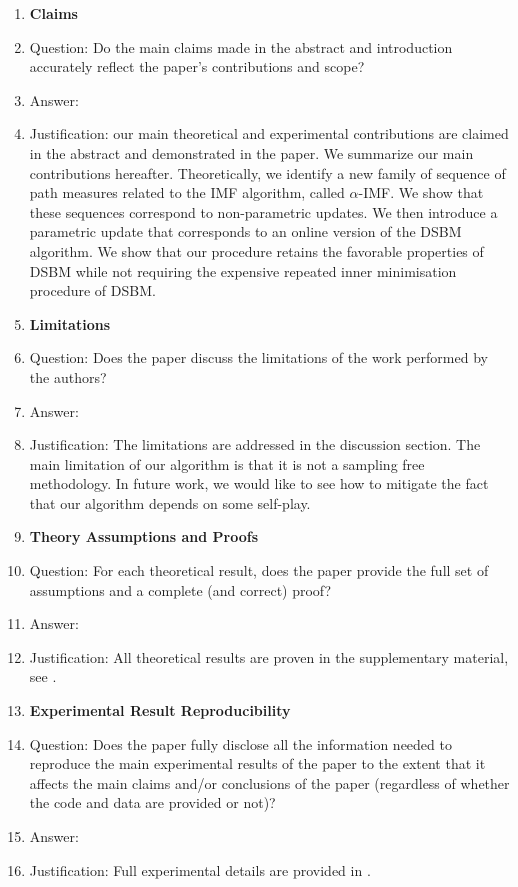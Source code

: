 \documentclass{article}
\begin{document}
\begin{enumerate}

\item {\bf Claims}
    \item[] Question: Do the main claims made in the abstract and introduction accurately reflect the paper's contributions and scope?
    \item[] Answer: \answerYes{}  %
    \item[] Justification: our main theoretical and experimental contributions are claimed in the abstract and demonstrated in the paper. We summarize our main contributions hereafter. Theoretically, we identify a new family of sequence of path measures related to the IMF algorithm, called $\alpha$-IMF. We show that these sequences correspond to non-parametric updates. We then introduce a parametric update that corresponds to an online version of the DSBM algorithm. We show that our procedure retains the favorable properties of DSBM while not requiring the expensive repeated inner minimisation procedure of DSBM.

\item {\bf Limitations}
    \item[] Question: Does the paper discuss the limitations of the work performed by the authors?
    \item[] Answer: \answerYes{} %
    \item[] Justification: The limitations are addressed in the discussion section. The main limitation of our algorithm is that it is not a sampling free methodology. In future work, we would like to see how to mitigate the fact that our algorithm depends on some self-play.

\item {\bf Theory Assumptions and Proofs}
    \item[] Question: For each theoretical result, does the paper provide the full set of assumptions and a complete (and correct) proof?
    \item[] Answer: \answerYes{} %
    \item[] Justification: All theoretical results are proven in the supplementary material, see .

    \item {\bf Experimental Result Reproducibility}
    \item[] Question: Does the paper fully disclose all the information needed to reproduce the main experimental results of the paper to the extent that it affects the main claims and/or conclusions of the paper (regardless of whether the code and data are provided or not)?
    \item[] Answer: \answerYes{} %
    \item[] Justification: Full experimental details are provided in .



\end{enumerate}
\end{document}
